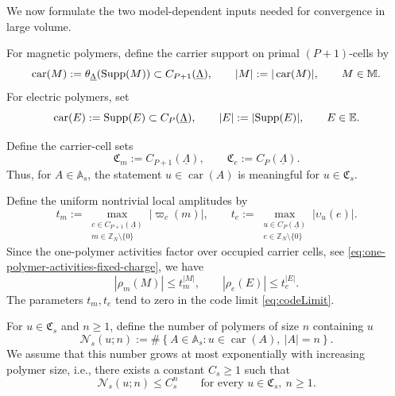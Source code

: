 We now formulate the two model-dependent inputs needed for convergence in large volume.

For magnetic polymers, define the carrier support on primal \((P+1)\)-cells by
\begin{equation}
	\operatorname{car}(M)
	:=
	\theta_{\underline\Lambda}(\mathrm{Supp}(M))
	\subset C_{P+1}(\underline\Lambda),
	\qquad
	|M|:=|\operatorname{car}(M)|,
	\qquad
	M\in \mathbb M .
	\label{eq:magnetic-carrier-size}
\end{equation}
For electric polymers, set
\begin{equation}
	\operatorname{car}(E):=\mathrm{Supp}(E)\subset C_P(\underline\Lambda),
	\qquad
	|E|:=|\mathrm{Supp}(E)|,
	\qquad
	E\in \mathbb E .
	\label{eq:electric-carrier-size}
\end{equation}

Define the carrier-cell sets
\begin{equation}
	\mathfrak C_m:=C_{P+1}(\underline\Lambda),
	\qquad
	\mathfrak C_e:=C_P(\underline\Lambda).
	\label{eq:carrier-cell-sets}
\end{equation}
Thus, for \(A\in\mathbb A_s\), the statement \(u\in\operatorname{car}(A)\) is meaningful
for \(u\in\mathfrak C_s\).

Define the uniform nontrivial local amplitudes by
\begin{equation}
	t_m
	:=
	\max_{\substack{c\in C_{P+1}(\underline\Lambda)\\ m\in \mathbb Z_N\setminus\{0\}}}
	|\varpi_c(m)|,
	\qquad
	t_e
	:=
	\max_{\substack{u\in C_P(\underline\Lambda)\\ e\in \mathbb Z_N\setminus\{0\}}}
	|\upsilon_u(e)|.
	\label{eq:tm-te}
\end{equation}
Since the one-polymer activities
factor over occupied carrier cells, see \eqref{eq:one-polymer-activities-fixed-charge},
we have
\begin{equation}
	|\rho_m(M)|\le t_m^{|M|},
	\qquad
	|\rho_e(E)|\le t_e^{|E|}.
	\label{eq:activity-hypothesis}
\end{equation}
The parameters \(t_m,t_e\) tend to zero in the code limit
\eqref{eq:codeLimit}.

For \(u\in\mathfrak C_s\) and \(n\ge 1\), define the number of polymers of size $n$ containing $u$
\begin{equation}
	\mathcal N_s(u;n)
	:=
	\#\left\{
	A\in\mathbb A_s:
	u\in\operatorname{car}(A),\ |A|=n
	\right\}.
	\label{eq:Ns-def}
\end{equation}
We assume that this number grows at most exponentially with increasing polymer size, i.e., there exists a constant \(C_s\ge 1\) such that
\begin{equation}
	\mathcal N_s(u;n)\le C_s^n
	\qquad
	\text{for every }u\in\mathfrak C_s,\ n\ge 1.
	\label{eq:counting-hypothesis}
\end{equation}

